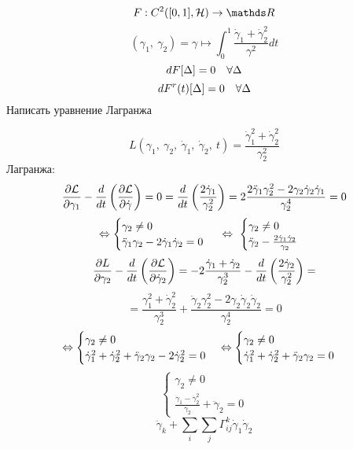 \documentclass[main]{subfiles}
\begin{document}
    \begin{Example}
        \[F: C^2([0,1], \mathcal{H}) \ra \R\]
        \[(\gamma_1,\ \gamma_2) = \gamma \mapsto \int_0^1 \frac{\dot{\gamma}_1 + \dot{\gamma}_2^2}{\gamma^2} dt\]
        \[d F[\Delta] = 0 \quad \forall \Delta\]
        \[d F^r(t)[\Delta] = 0 \quad \forall \Delta\]
        Написать уравнение Лагранжа
    \end{Example}

    \begin{Sol}
        \[L(\gamma_1,\ \gamma_2,\ \dot{\gamma}_1,\ \dot{\gamma}_2,\ t) = \frac{\dot{\gamma}_1^2 + \dot{\gamma}_2^2}{\gamma_2^2}\]
        Лагранжа:
        \[\frac{\partial \mathcal{L}}{\partial \gamma_1} - \frac{d}{dt}\left(\frac{\partial \mathcal{L}}{\partial \dot{\gamma}}\right) = 0 = \frac{d}{dt} \left(\frac{2 \dot{\gamma}_1}{\gamma_2^2}\right) = 2\frac{2 \ddot{\gamma}_1 \gamma_2^2 - 2\gamma_2 \dot{\gamma}_2 \dot{\gamma}_1}{\gamma_2^4} = 0\]
        \[\lra \begin{cases}
            \gamma_2 \neq 0\\
            \ddot{\gamma}_1 \gamma_2 - 2 \dot{\gamma}_1 \dot{\gamma}_2 = 0
        \end{cases} \ \lra\ \begin{cases} %
            \gamma_2 \neq 0\\
            \ddot{\gamma}_2 - \frac{2 \dot{\gamma}_1 \dot{\gamma}_2}{\gamma_2}
        \end{cases}\]
        \[\frac{\partial L}{\partial \gamma_2} - \frac{d}{dt}\left(\frac{\partial \mathcal{L}}{\partial \dot{\gamma}_2}\right) = -2 \frac{\dot{\gamma}_1 + \dot{\gamma}_2}{\gamma_2^3} - \frac{d}{dt} \left(\frac{2 \dot{\gamma}_2}{\gamma_2^2}\right) = \]
        \[= \frac{\gamma_1^2 + \dot{\gamma}_2^2}{\gamma_2^3} + \frac{\ddot{\gamma}_2 \gamma_2^2 - 2 \gamma_2 \dot{\gamma}_2 \dot{\gamma}_2}{\gamma_2^4} = 0\]
        \[\Leftrightarrow \begin{cases}
            \gamma_2 \neq 0\\
            \dot{\gamma}_1^2 + \dot{\gamma}_2^2 + \ddot{\gamma}_2 \gamma_2 - 2 \dot{\gamma}_2^2 = 0
        \end{cases} \Leftrightarrow \begin{cases}
            \gamma_2 \neq 0\\
            \dot{\gamma}_1^2 + \dot{\gamma}_2^2 + \ddot{\gamma}_2 \gamma_2 = 0
        \end{cases}\]
        \[\begin{cases} %
            \gamma_2 \neq 0\\
            \frac{\dot{\gamma}_1 - \dot{\gamma}_2^2}{\gamma_2} + \ddot{\gamma}_2 = 0
        \end{cases}\]
        \[\ddot{\gamma}_k + \sum_i \sum_j \Gamma_{ij}^k \dot{\gamma}_1 \dot{\gamma}_2\]
    \end{Sol}
\end{document}
